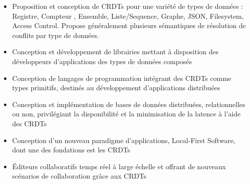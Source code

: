 \begin{itemize}
  \item Proposition et conception de \acp{CRDT} pour une variété de types de données : Registre, Compteur , Ensemble, Liste/Sequence, Graphe, JSON, Filesystem, Access Control.
    Propose généralement plusieurs sémantiques de résolution de conflits par type de données.
  \item Conception et développement de librairies mettant à disposition des développeurs d'applications des types de données composés \cite{Nicolaescu2015Yjs, Nicolaescu2016YATA, yjsimplem, jsoncrdt2017, automerge}
  \item Conception de langages de programmation intégrant des CRDTs comme types primitifs, destinés au développement d'applications distribuées \cite{Meiklejohn2015Lasp2, DePorre2020cscript}
  \item Conception et implémentation de bases de données distribuées, relationnelles ou non, privilégiant la disponibilité et la minimisation de la latence à l'aide des CRDTs \cite{RiakKV, AntidoteDB, Anna2021, Concordant, yu:hal-02983557}
  \item Conception d'un nouveau paradigme d'applications, Local-First Software, dont une des fondations est les CRDTs \cite{localfirstsoftware2019, pushpin2020}
  \item Éditeurs collaboratifs temps réel à large échelle et offrant de nouveaux scénarios de collaboration grâce aux CRDTs \cite{Nedelec2016CRATE, MUTE2017}
\end{itemize}
